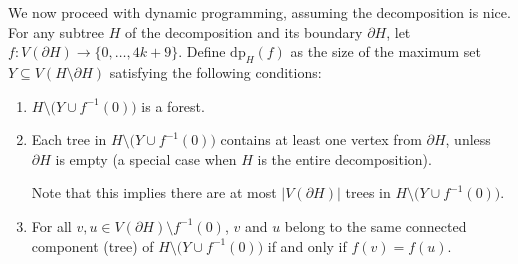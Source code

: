 \documentclass[12pt]{article}
\begin{document}
	We now proceed with dynamic programming, assuming the decomposition is nice.
	For any subtree \(H\) of the decomposition and its boundary \(\partial H\),
	let \(f : V(\partial H) \to \{0, \ldots, 4k + 9\}\). Define
	\(\text{dp}_{H}(f)\) as the size of the maximum set \(Y \subseteq
	V(H \setminus \partial H)\) satisfying the following conditions:
	\begin{enumerate}
		\item \(H \setminus \big( Y \cup f^{-1}(0) \big)\) is a forest.
		
		\item Each tree in \(H \setminus \big( Y \cup f^{-1}(0) \big)\) contains
		      at least one vertex from \(\partial H\), unless \(\partial H\) is
		      empty (a special case when \(H\) is the entire decomposition).
		      
		      Note that this implies there are at most \(|V(\partial H)|\) trees
		      in \(H \setminus \big( Y \cup f^{-1}(0) \big)\).
		
		\item For all \(v, u \in V(\partial H) \setminus f^{-1}(0)\), \(v\) and
		      \(u\) belong to the same connected component (tree) of \(H
		      \setminus \big( Y \cup f^{-1}(0) \big)\) if and only if \(f(v) =
		      f(u)\).
	\end{enumerate}
	
	\medskip
	
\end{document}
